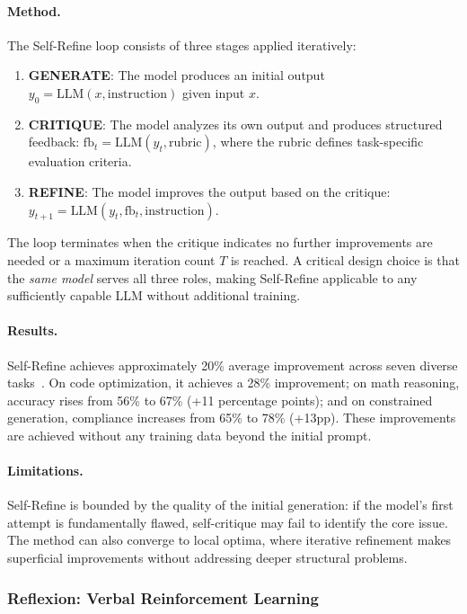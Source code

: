 \paragraph{Method.}
The Self-Refine loop consists of three stages applied iteratively:

\begin{enumerate}
    \item \textbf{GENERATE}: The model produces an initial output $y_0 = \text{LLM}(x, \text{instruction})$ given input $x$.
    \item \textbf{CRITIQUE}: The model analyzes its own output and produces structured feedback: $\text{fb}_t = \text{LLM}(y_t, \text{rubric})$, where the rubric defines task-specific evaluation criteria.
    \item \textbf{REFINE}: The model improves the output based on the critique: $y_{t+1} = \text{LLM}(y_t, \text{fb}_t, \text{instruction})$.
\end{enumerate}

The loop terminates when the critique indicates no further improvements are needed or a maximum iteration count $T$ is reached. A critical design choice is that the \emph{same model} serves all three roles, making Self-Refine applicable to any sufficiently capable LLM without additional training.

\paragraph{Results.}
Self-Refine achieves approximately 20\% average improvement across seven diverse tasks~\citep{madaan2023selfrefine}. On code optimization, it achieves a 28\% improvement; on math reasoning, accuracy rises from 56\% to 67\% (+11 percentage points); and on constrained generation, compliance increases from 65\% to 78\% (+13pp). These improvements are achieved without any training data beyond the initial prompt.

\paragraph{Limitations.}
Self-Refine is bounded by the quality of the initial generation: if the model's first attempt is fundamentally flawed, self-critique may fail to identify the core issue. The method can also converge to local optima, where iterative refinement makes superficial improvements without addressing deeper structural problems.

\subsubsection{Reflexion: Verbal Reinforcement Learning}
\label{sec:reflexion}

